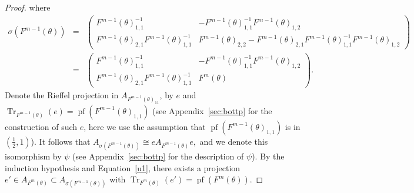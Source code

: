 \documentclass[9pt, BCOR=2mm]{amsart}
\numberwithin{equation}{section}
\numberwithin{equation}{section}
\newcommand{\pf}{{\operatorname{pf}}}
\DeclareMathOperator{\Tr}{Tr}
\begin{document}
\begin{proof}
where
\begin{eqnarray}\sigma(F^{m-1}(\theta))&=&\left(\begin{matrix}
                  F^{m-1}(\theta)_{1,1}^{-1} & -F^{m-1}(\theta)_{1,1}^{-1}F^{m-1}(\theta)_{1,2} \\
                 F^{m-1}(\theta)_{2,1}F^{m-1}(\theta)_{1,1}^{-1} & F^{m-1}(\theta)_{2,2}-F^{m-1}(\theta)_{2,1}F^{m-1}(\theta)_{1,1}^{-1}F^{m-1}(\theta)_{1,2}
                \end{matrix}
\right)\nonumber\\
&=&\left(\begin{matrix}
                  F^{m-1}(\theta)_{1,1}^{-1} & -F^{m-1}(\theta)_{1,1}^{-1}F^{m-1}(\theta)_{1,2} \\
                 F^{m-1}(\theta)_{2,1}F^{m-1}(\theta)_{1,1}^{-1} & F^{m}(\theta)
                \end{matrix}
\right).\nonumber
\end{eqnarray}
Denote the Rieffel projection in $A_{F^{m-1}(\theta)_{11}}$, by $e$ and  $\Tr_{F^{m-1}(\theta)}(e)={\pf}(F^{m-1}(\theta)_{1,1})$ (see Appendix~\ref{sec:bottp} for the construction of such $e$, here we use the assumption that ${\pf}(F^{m-1}(\theta)_{1,1})$ is in $(\frac{1}{2},1)$). It follows that $A_{\sigma(F^{m-1}(\theta))}\cong eA_{F^{m-1}(\theta)}e,$ and we denote this isomorphism by $\psi$ (see Appendix~\ref{sec:bottp} for the description of $\psi$). By the induction hypothesis and Equation~\ref{u1}, there exists a projection $e'\in A_{F^{m}(\theta)}\subset A_{\sigma(F^{m-1}(\theta))}$ with
$\Tr_{F^{m}(\theta)}(e')={\pf}(F^m(\theta)).
$
 

\end{proof}
\end{document}
